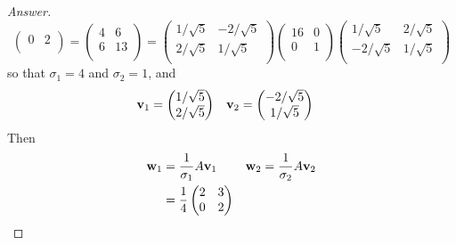 \documentclass[../psets.tex]{subfiles}
\begin{document}
\begin{enumerate}[label={\textbf{3.\arabic*.}}]
\begin{proof}[Answer]
\begin{equation*}
\begin{pmatrix}
                0 & 2\\
            \end{pmatrix}
            =
            \begin{pmatrix}
                4 & 6\\
                6 & 13\\
            \end{pmatrix}
            =
            \begin{pmatrix}
                1/\sqrt{5} & -2/\sqrt{5}\\
                2/\sqrt{5} & 1/\sqrt{5}\\
            \end{pmatrix}
            \begin{pmatrix}
                16 & 0\\
                0 & 1\\
            \end{pmatrix}
            \begin{pmatrix}
                1/\sqrt{5} & 2/\sqrt{5}\\
                -2/\sqrt{5} & 1/\sqrt{5}\\
            \end{pmatrix}
        \end{equation*}
        so that $\sigma_1=4$ and $\sigma_2=1$, and
        \begin{align*}
            \mathbf{v}_1 &=
            \begin{pmatrix}
                1/\sqrt{5}\\
                2/\sqrt{5}\\
            \end{pmatrix}&
            \mathbf{v}_2 &=
            \begin{pmatrix}
                -2/\sqrt{5}\\
                1/\sqrt{5}\\
            \end{pmatrix}
        \end{align*}
        Then
        \begin{align*}
            \wm_1 &= \frac{1}{\sigma_1}A\vm_1&
                \wm_2 &= \frac{1}{\sigma_2}A\vm_2\\
            &= \frac{1}{4}
            \begin{pmatrix}
                2 & 3\\
                0 & 2\\
            \end{pmatrix}

\end{align*}
\end{proof}
\end{enumerate}
\end{document}

